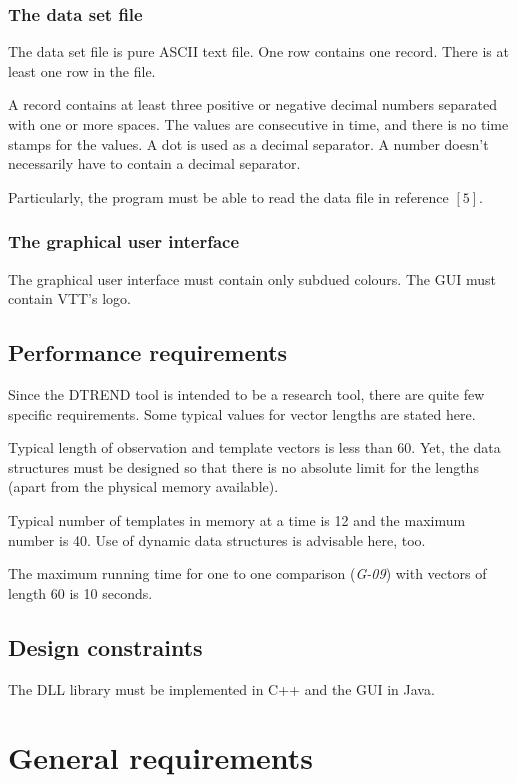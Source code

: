 \documentclass[a4paper,11pt]{article}
\begin{document}
\subsubsection{The data set file}
\label{sec:datafile}
The data set file is pure ASCII text file. One row contains one record. There is at least one row in the file.

A record contains at least three positive or negative decimal numbers separated with one or more spaces. The values 
are consecutive in time, and there is no time stamps for the values. A dot is used as a decimal separator. A number doesn't 
necessarily have to contain a decimal separator.

Particularly, the program must be able to read the data file in reference $[5]$.

\subsubsection{The graphical user interface}
The graphical user interface must contain only subdued colours. The GUI must contain VTT's logo.

\subsection{Performance requirements}
Since the DTREND tool is intended to be a research tool, there are quite few specific requirements. Some typical values for
vector lengths are stated here.

Typical length of observation and template vectors is less than 60. Yet, the data structures must be designed so that there is no
absolute limit for the lengths (apart from the physical memory available).

Typical number of templates in memory at a time is 12 and the maximum number is 40. Use of dynamic data structures is advisable
here, too.

The maximum running time for one to one comparison (\emph{G-09}) with vectors of length 60 is 10 seconds.

\subsection{Design constraints}
The DLL library must be implemented in C++ and the GUI in Java.

\section{General requirements}
\end{document}
